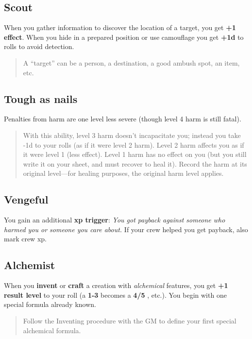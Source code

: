 \documentclass[11pt,fleqn,a5paper]{book}
\newcommand{\gameterm}[1]{\textbf{#1}}
\begin{document}
\subsection{Scout}

When you gather information to discover the location of a target, you get \textbf{+1 effect}. When you hide in a prepared position or use camouflage you get \textbf{+1d} to rolls to avoid detection.

\begin{quote}
	A “target” can be a person, a destination, a good ambush spot, an item, etc.
\end{quote} 

\subsection{Tough as nails}

Penalties from harm are one level less severe (though level 4 harm is still fatal).

\begin{quote}
	With this ability, level 3 harm doesn’t incapacitate you; instead you take -1d to your rolls (as if it were level 2 harm). Level 2 harm affects you as if it were level 1 (less effect). Level 1 harm has no effect on you (but you still write it on your sheet, and must recover to heal it). Record the harm at its original level---for healing purposes, the original harm level applies.
\end{quote} 

\subsection{Vengeful}

You gain an additional \textbf{xp trigger}: \emph{You got payback against someone who harmed you or someone you care about.} If your crew helped you get payback, also mark crew xp.

\subsection{Alchemist}

When you \textbf{invent} or \textbf{craft} a creation with \emph{alchemical} features, you get \textbf{+1 result level} to your roll (a \gameterm{1-3}  becomes a \gameterm{4/5} , etc.). You begin with one special formula already known.

\begin{quote}
	Follow the Inventing procedure with the GM to define your first special alchemical formula.
\end{quote} 
\end{document}
